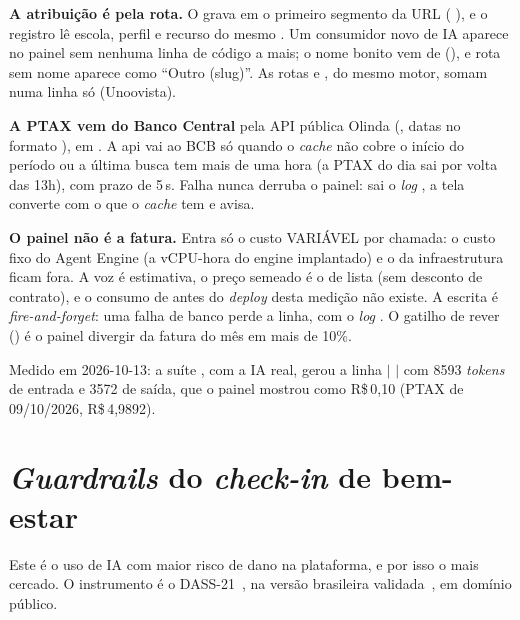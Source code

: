 \textbf{A atribuição é pela rota.} O  grava em
 o primeiro segmento da URL
( \seta{} ), e o registro lê
escola, perfil e recurso do mesmo . Um consumidor novo de
IA aparece no painel sem nenhuma linha de código a mais; o nome bonito vem de
 (), e rota sem nome aparece
como \enquote{Outro (slug)}. As rotas  e , do mesmo motor,
somam numa linha só (Unoovista).

\textbf{A PTAX vem do Banco Central} pela API pública Olinda
(, datas no formato ), em
. A api vai ao BCB só quando o \emph{cache}
não cobre o início do período ou a última busca tem mais de uma hora (a PTAX do
dia sai por volta das 13h), com prazo de 5\,s. Falha nunca derruba o painel:
sai o \emph{log} , a tela converte com o que o
\emph{cache} tem e avisa.

\begin{limitacao}
\textbf{O painel não é a fatura.} Entra só o custo VARIÁVEL por chamada: o
custo fixo do Agent Engine (a vCPU-hora do engine implantado) e o da
infraestrutura ficam fora. A voz é estimativa, o preço semeado é o de lista
(sem desconto de contrato), e o consumo de antes do \emph{deploy} desta
medição não existe. A escrita é \emph{fire-and-forget}: uma falha de banco
perde a linha, com o \emph{log} . O gatilho de
rever () é o painel divergir da fatura do mês em mais de 10\%.
\end{limitacao}

Medido em 2026-10-13: a suíte , com a IA real,
gerou a linha  $|$  $|$  com
\num{8593} \emph{tokens} de entrada e \num{3572} de saída, que o painel mostrou
como R\$\,0,10 (PTAX de 09/10/2026, R\$\,4,9892).

\section{\emph{Guardrails} do \emph{check-in} de bem-estar}

Este é o uso de IA com maior risco de dano na plataforma, e por isso o mais
cercado. O instrumento é o DASS-21~\cite{lovibond1995dass}, na versão brasileira
validada~\cite{vignola2014dass21}, em domínio público.

